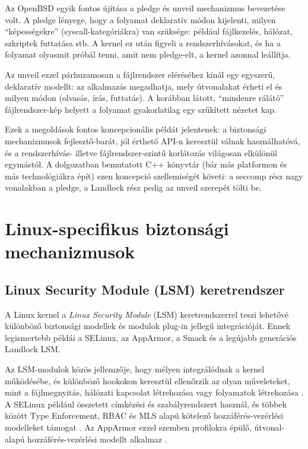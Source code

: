 Az OpenBSD egyik fontos újítása a pledge és unveil
mechanizmus bevezetése volt.
A pledge lényege, hogy a folyamat
deklaratív módon kijelenti, milyen ``képességekre'' (syscall-kategóriákra) van
szüksége: például fájlkezelés, hálózat, szkriptek futtatása stb. A kernel ez
után figyeli a rendszerhívásokat, és ha a folyamat olyasmit próbál tenni, amit
nem pledge-elt, a kernel azonnal leállítja. \cite{openbsd_pledge_2}

Az unveil ezzel párhuzamosan a fájlrendszer eléréséhez kínál egy
egyszerű, deklaratív modellt: az alkalmazás megadhatja, mely útvonalakat
érheti el és milyen módon (olvasás, írás, futtatás). A korábban látott,
``mindenre rálátó'' fájlrendszer-kép helyett a folyamat gyakorlatilag egy
szűkített nézetet kap. \cite{openbsd_unveil_2}

Ezek a megoldások fontos koncepcionális példát jelentenek: a biztonsági
mechanizmusok fejlesztő-barát, jól érthető API-n keresztül válnak
használhatóvá, és a rendszerhívás- illetve fájlrendszer-szintű korlátozás
világosan elkülönül egymástól. A dolgozatban bemutatott C++ könyvtár (bár
más platformon és más technológiákra épít) ezen koncepció szellemiségét
követi: a seccomp rész nagy vonalakban a pledge, a
Landlock rész pedig az unveil szerepét tölti be.


\section{Linux-specifikus biztonsági mechanizmusok}

\subsection{Linux Security Module (LSM) keretrendszer}

A Linux kernel a \emph{Linux Security Module} (LSM) keretrendszerrel teszi
lehetővé különböző biztonsági modellek és modulok plug-in jellegű
integrációját. Ennek legismertebb példái a SELinux, az AppArmor, a Smack és a
legújabb generációs Landlock LSM. \cite{linux_landlock_lsm}

Az LSM-modulok közös jellemzője, hogy mélyen integrálódnak a kernel
működésébe, és különböző hookokon keresztül ellenőrzik az olyan műveleteket,
mint a fájlmegnyitás, hálózati kapcsolat létrehozása vagy folyamatok
létrehozása \cite{linux_lsm_hooks}. A SELinux például összetett címkézési
és szabályrendszert használ, és többek között Type Enforcement, RBAC és MLS
alapú kötelező hozzáférés-vezérlési modelleket támogat
\cite{selinux_8}. Az AppArmor ezzel szemben
profilokra épülő, útvonal-alapú hozzáférés-vezérlési modellt alkalmaz
\cite{linux_apparmor_lsm}.

